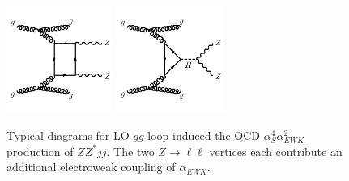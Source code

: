 \begin{figure}[!htbp]
  \begin{center}
  \includegraphics[width=0.31\textwidth]{figures/Theory/diagramQCDZZjjbox.pdf}
  \includegraphics[width=0.31\textwidth]{figures/Theory/diagramQCDZZjjggH.pdf}\\
  \end{center}
  \caption{Typical diagrams for LO $gg$ loop induced the QCD $\alpha_{S}^4\alpha_{EWK}^{2}$ production of $ZZ^*jj$. The two $Z\rightarrow \ell \ell$ vertices each contribute an additional electroweak coupling of $\alpha_{EWK}$. \label{fig:ZZjjFeynmanDiag_QCD_gg}}
 \end{figure}
 
